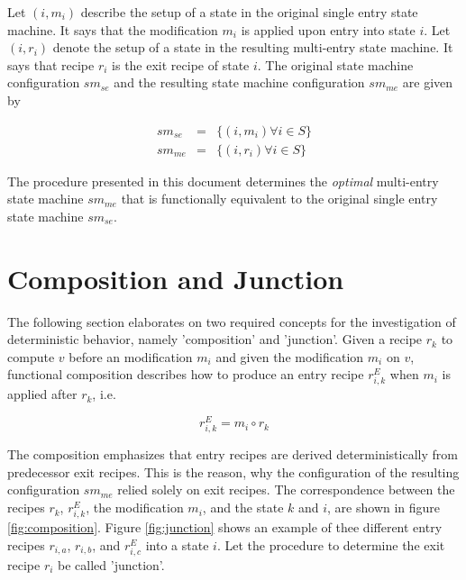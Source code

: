 \documentclass[12pt,a4paper]{scrartcl}
\begin{document}
Let $(i, m_i)$ describe the setup of a state in the original single entry state
machine. It says that the modification $m_i$ is applied upon entry into state
$i$. Let $(i, r_i)$ denote the setup of a state in the resulting multi-entry
state machine. It says that recipe $r_i$ is the exit recipe of state $i$. The
original state machine configuration $sm_{se}$ and the resulting state machine
configuration $sm_{me}$ are given by

\begin{eqnarray}
    sm_{se} & = & \{(i,m_i) \forall i \in S\} \\
    sm_{me} & = & \{(i,r_i) \forall i \in S\}
\end{eqnarray}

The procedure presented in this document determines the \textit{optimal}
multi-entry state machine $sm_{me}$ that is functionally equivalent to 
the original single entry state machine $sm_{se}$.

%
\section{Composition and Junction}

The following section elaborates on two required concepts for the investigation
of deterministic behavior, namely 'composition' and 'junction'.  Given a recipe
$r_k$ to compute $v$ before an modification $m_i$ and given the modification
$m_i$ on $v$, functional composition describes how to produce an entry recipe
$r^E_{i,k}$ when $m_i$ is applied after $r_k$, i.e.

\begin{equation} \label{eq:composition}
    r^E_{i,k} = m_i \circ r_k
\end{equation}

The composition emphasizes that entry recipes are derived deterministically
from predecessor exit recipes. This is the reason, why the configuration of the resulting
configuration $sm_{me}$ relied solely on exit recipes.  The correspondence
between the recipes $r_k$, $r^E_{i,k}$, the modification $m_i$, and the state
$k$ and $i$, are shown in figure \ref{fig:composition}.  Figure
\ref{fig:junction} shows an example of thee different entry recipes $r_{i,a}$,
$r_{i,b}$, and $r^E_{i,c}$ into a state $i$. Let the procedure to determine the
exit recipe $r_i$ be called 'junction'. 
\end{document}
